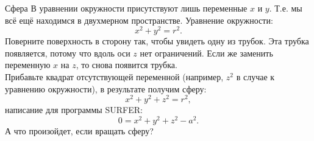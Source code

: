 \begin{surferPage}{Сфера}
В уравнении окружности присутствуют лишь переменные $x$ и $y$. Т.е. мы всё ещё находимся в двухмерном пространстве. Уравнение окружности: 
\[x^2+y^2=r^2.\]
Поверните поверхность в сторону так, чтобы увидеть одну из трубок. Эта трубка появляется, потому что вдоль оси $z$ нет ограничений. Если же заменить переменную $x$ на $z$, то снова появится трубка.\\
Прибавьте квадрат отсутствующей переменной (например, $z^2$ в случае к уравнению окружности), в результате получим сферу: 
\[x^2+y^2+z^2=r^2,\]
написание для программы SURFER:
\[0=x^2+y^2+z^2-a^2.\]
А что произойдет, если вращать сферу?
\end{surferPage}
